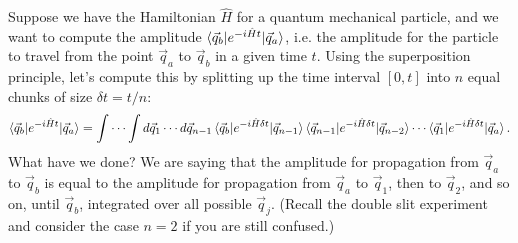 \documentclass{report}
\theoremstyle{plain}
\theoremstyle{definition}
\theoremstyle{remark}
\begin{document}
Suppose we have the Hamiltonian $\hat{H}$ for a quantum mechanical
particle, and we want to compute the amplitude
$\braket{\vec{q}_b|e^{-i\hat{H}t}|\vec{q}_a}$, i.e. the amplitude for
the particle to travel from the point $\vec{q}_a$ to $\vec{q}_b$ in a
given time $t$. Using the superposition principle, let's compute this
by splitting up the time interval $[0, t]$ into $n$ equal chunks of
size $\delta t = t/n$:
$$ \braket{\vec{q}_b|e^{-i\hat{H}t}|\vec{q}_a} = \int \cdots \int d\vec{q}_1 \cdots d\vec{q}_{n-1} \braket{\vec{q}_b|e^{-i\hat{H}\delta t}|\vec{q}_{n-1}} \braket{\vec{q}_{n-1}|e^{-i\hat{H}\delta t}|\vec{q}_{n-2}} \cdots \braket{\vec{q}_1|e^{-i\hat{H}\delta t}|\vec{q}_a}. $$
What have we done? We are saying that the amplitude for propagation
from $\vec{q}_a$ to $\vec{q}_b$ is equal to the amplitude for
propagation from $\vec{q}_a$ to $\vec{q}_1$, then to $\vec{q}_2$, and
so on, until $\vec{q}_b$, integrated over all possible $\vec{q}_j$.
(Recall the double slit experiment and consider the case $n = 2$ if
you are still confused.)
\end{document}

